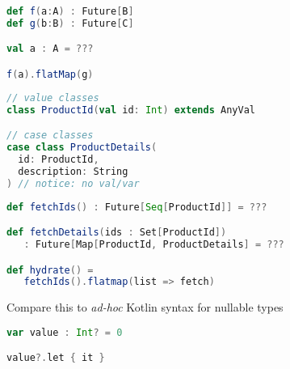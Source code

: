 \documentclass[10pt]{beamer}
\begin{document}
\begin{frame}[fragile]
\begin{lstlisting}[language=Scala, basicstyle=\ttfamily]
def f(a:A) : Future[B]
def g(b:B) : Future[C]

val a : A = ???

f(a).flatMap(g)
\end{lstlisting}
\end{frame}
\begin{frame}[fragile]
\begin{lstlisting}[language=Scala, basicstyle=\ttfamily]
// value classes 
class ProductId(val id: Int) extends AnyVal 

// case classes 
case class ProductDetails(
  id: ProductId,
  description: String
) // notice: no val/var 
\end{lstlisting}
\end{frame}


\begin{frame}[fragile]
\begin{lstlisting}[language=Scala, basicstyle=\ttfamily]
def fetchIds() : Future[Seq[ProductId]] = ???

def fetchDetails(ids : Set[ProductId]) 
   : Future[Map[ProductId, ProductDetails] = ???

def hydrate() = 
   fetchIds().flatmap(list => fetch)

\end{lstlisting}
\end{frame}

\begin{frame}[fragile]
Compare this to \emph{ad-hoc} Kotlin syntax for nullable types 
\begin{lstlisting}[language=Scala, basicstyle=\ttfamily]
var value : Int? = 0

value?.let { it }
\end{lstlisting}
\end{frame}






\end{document}

